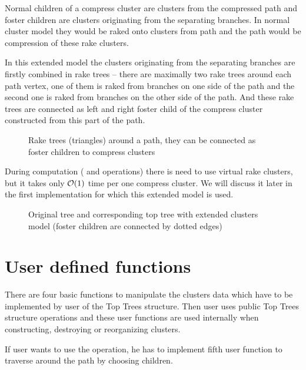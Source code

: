 Normal children of a compress cluster are clusters from the compressed path and
foster children are clusters originating from the separating branches. In normal
cluster model they would be raked onto clusters from path and the path would be
compression of these rake clusters.

In this extended model the clusters originating from the separating branches are
firstly combined in {\I rake trees} -- there are maximally two rake
trees around each path vertex, one of them is raked from branches on one side of
the path and the second one is raked from branches on the other side of the
path. And these rake trees are connected as left and right foster child of the
compress cluster constructed from this part of the path.

\begin{figure}[h]
\centering
{}
\caption[Rake trees around a path]
{Rake trees (triangles) around a path, they can be connected as foster children
to compress clusters}
\end{figure}

During computation (\Join{} and \Split{} operations) there is need to use
virtual rake clusters, but it takes only ${\cal O}(1)$ time per one compress
cluster. We will discuss it later in the first implementation for which this
extended model is used.

\begin{figure}[h]
\centering
{}
\caption[Original tree and corresponding top tree with extended clusters model]
{Original tree and corresponding top tree with extended clusters model
(foster children are connected by dotted edges)}
\end{figure}



\section{User defined functions}

There are four basic functions to manipulate the clusters data which have to
be implemented by user of the Top Trees structure. Then user uses public Top
Trees structure operations and these user functions are used internally when
constructing, destroying or reorganizing clusters.

If user wants to use the \Search{} operation, he has to implement fifth user
function \Choose{} to traverse around the path by choosing children.

